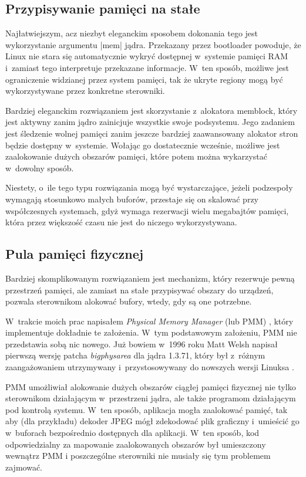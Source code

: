 \subsection{Przypisywanie pamięci na stałe}

Najłatwiejszym, acz niezbyt eleganckim sposobem dokonania tego jest
wykorzystanie argumentu \code|mem| jądra.  Przekazany przez
bootloader powoduje, że Linux nie stara się automatycznie wykryć
dostępnej w~systemie pamięci RAM i~zamiast tego interpretuje
przekazane informacje.  W~ten sposób, możliwe jest ograniczenie
widzianej przez system pamięci, tak że ukryte regiony mogą być
wykorzystywane przez konkretne sterowniki.

Bardziej eleganckim rozwiązaniem jest skorzystanie z~alokatora
memblock, który jest aktywny zanim jądro zainicjuje wszystkie swoje
podsystemu.  Jego zadaniem jest śledzenie wolnej pamięci zanim jeszcze
bardziej zaawansowany alokator stron będzie dostępny w~systemie.
Wołając go dostatecznie wcześnie, możliwe jest zaalokowanie dużych
obszarów pamięci, które potem można wykarzystać w~dowolny sposób.

Niestety, o~ile tego typu rozwiązania mogą być wystarczające, jeżeli
podzespoły wymagają stosunkowo małych buforów, przestaje się on
skalować przy współczesnych systemach, gdyż wymaga rezerwacji wielu
megabajtów pamięci, która przez większość czasu nie jest do niczego
wykorzystywana.

\subsection{Pula pamięci fizycznej}

Bardziej skomplikowanym rozwiązaniem jest mechanizm, który rezerwuje
pewną przestrzeń pamięci, ale zamiast na stałe przypisywać obszary do
urządzeń, pozwala sterownikom alokować bufory, wtedy, gdy są one
potrzebne.

W~trakcie moich prac napisałem {\it Physical Memory Manager} (lub PMM)
\cite{patch:pmm}, który implementuje dokładnie te założenia. W~tym
podstawowym założeniu, PMM nie przedstawia sobą nic nowego.  Już
bowiem w~1996 roku Matt Welsh napisał pierwszą wersję patcha
\emph{bigphysarea} dla jądra 1.3.71, który był z~różnym zaangażowaniem
utrzymywany i~przystosowywany do nowszych wersji Linuksa
\cite{patch:bigphys}.

PMM umożliwiał alokowanie dużych obszarów ciągłej pamięci fizycznej
nie tylko sterownikom działającym w~przestrzeni jądra, ale także
programom działającym pod kontrolą systemu.  W~ten sposób, aplikacja
mogła zaalokować pamięć, tak aby (dla przykładu) dekoder JPEG mógł
zdekodować plik graficzny i~umieścić go w~buforach bezpośrednio
dostępnych dla aplikacji.  W~ten sposób, kod odpowiedzialny za
mapowanie zaalokowanych obszarów był umieszczony wewnątrz PMM
i poszczególne sterowniki nie musiały się tym problemem zajmować.

